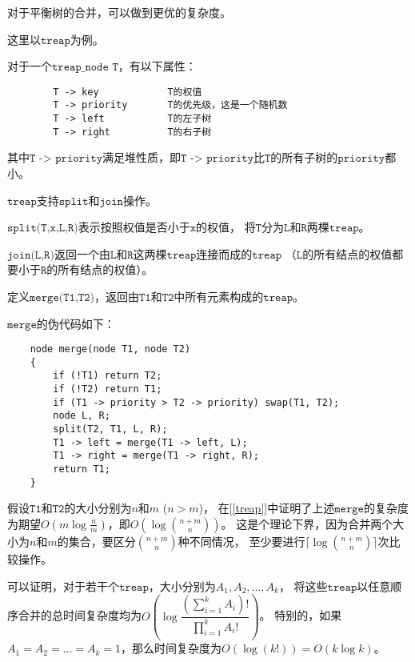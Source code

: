 \documentclass{noiassignment}
\begin{document}
对于平衡树的合并，可以做到更优的复杂度。

这里以$\texttt{treap}$为例。

对于一个$\texttt{treap\_node T}$，有以下属性：
\begin{verbatim}
        T -> key            T的权值
        T -> priority       T的优先级，这是一个随机数
        T -> left           T的左子树
        T -> right          T的右子树
\end{verbatim}

其中$\texttt{T -> priority}$满足堆性质，即$\texttt{T -> priority}$比$\texttt{T}$的所有子树的$\texttt{priority}$都小。

\text{}

$\texttt{treap}$支持$\texttt{split}$和$\texttt{join}$操作。

$\texttt{split(T,x,L,R)}$表示按照权值是否小于$\texttt{x}$的权值，
将$\texttt{T}$分为$\texttt{L}$和$\texttt{R}$两棵$\texttt{treap}$。

$\texttt{join(L,R)}$返回一个由$\texttt{L}$和$\texttt{R}$这两棵$\texttt{treap}$连接而成的$\texttt{treap}$
（$\texttt{L}$的所有结点的权值都要小于$\texttt{R}$的所有结点的权值）。

\text{}

定义$\texttt{merge(T1,T2)}$，返回由$\texttt{T1}$和$\texttt{T2}$中所有元素构成的$\texttt{treap}$。

$\texttt{merge}$的伪代码如下：

\begin{verbatim}
    node merge(node T1, node T2)
    {
        if (!T1) return T2;
        if (!T2) return T1;
        if (T1 -> priority > T2 -> priority) swap(T1, T2);
        node L, R;
        split(T2, T1, L, R);
        T1 -> left = merge(T1 -> left, L);
        T1 -> right = merge(T1 -> right, R);
        return T1;
    }
\end{verbatim}

\text{}

假设$\texttt{T1}$和$\texttt{T2}$的大小分别为$n$和$m$ ($n > m$)，
在[\ref{treap}]中证明了上述$\texttt{merge}$的复杂度为期望$O(m \log \frac{n}{m})$，即$O(\log \binom{n+m}{n})$。
这是个理论下界，因为合并两个大小为$n$和$m$的集合，要区分$\binom{n+m}{n}$种不同情况，
至少要进行$\lceil \log \binom{n+m}{n} \rceil$次比较操作。

可以证明，对于若干个$\texttt{treap}$，大小分别为$A_1, A_2, ..., A_k$，
将这些$\texttt{treap}$以任意顺序合并的总时间复杂度均为$O(\log \dfrac{(\sum_{i=1}^{k} A_i) !}{\prod_{i=1}^{k} A_i !})$。
特别的，如果$A_1 = A_2 = ... = A_k = 1$，那么时间复杂度为$O(\log (k!)) = O(k \log k)$。
\end{document}
